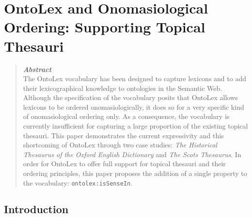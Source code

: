 \chapter{OntoLex and Onomasiological Ordering: Supporting Topical Thesauri}




\begin{abstract}
\textbf{\emph{Abstract}}
\\
The OntoLex vocabulary has been designed to capture lexicons and to add their lexicographical knowledge to ontologies in the Semantic Web. Although the specification of the vocabulary posits that OntoLex allows lexicons to be ordered onomasiologically, it does so for a very specific kind of onomasiological ordering only. As a consequence, the vocabulary is currently insufficient for capturing a large proportion of the existing topical thesauri. This paper demonstrates the current expressivity and this shortcoming of OntoLex through two case studies: \textit{The Historical Thesaurus of the Oxford English Dictionary} and \textit{The Scots Thesaurus}. In order for OntoLex to offer full support for topical thesauri and their ordering principles, this paper proposes the addition of a single property to the vocabulary: \texttt{ontolex:isSenseIn}. %
\end{abstract}



\section{Introduction}

